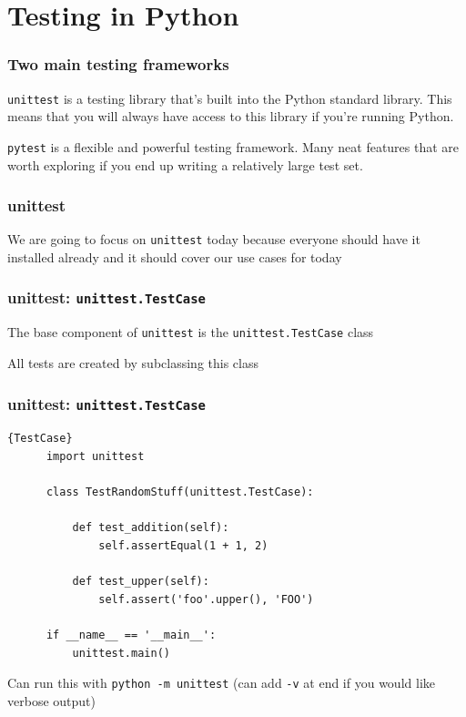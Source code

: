 \documentclass[10pt]{beamer}
\begin{document}
\section{Testing in Python}

  \begin{frame} \frametitle{Two main testing frameworks}

    \texttt{unittest} is a testing library that's built into the Python standard library.
    This means that you will always have access to this library if you're running Python.

    \vspace{0.25cm}

    \texttt{pytest} is a flexible and powerful testing framework. Many neat features
    that are worth exploring if you end up writing a relatively large test set.

  \end{frame}

  \begin{frame} \frametitle{unittest}

    We are going to focus on \texttt{unittest} today because everyone should have it
    installed already and it should cover our use cases for today

  \end{frame}

  \begin{frame} \frametitle{unittest: \texttt{unittest.TestCase}}

    The base component of \texttt{unittest} is the \texttt{unittest.TestCase} class

    \vspace{0.25cm}

    All tests are created by subclassing this class

  \end{frame}

  \begin{frame}[fragile] \frametitle{unittest: \texttt{unittest.TestCase}}

      \begin{lstlisting}{TestCase}
      import unittest

      class TestRandomStuff(unittest.TestCase):

          def test_addition(self):
              self.assertEqual(1 + 1, 2)

          def test_upper(self):
              self.assert('foo'.upper(), 'FOO')

      if __name__ == '__main__':
          unittest.main()

      \end{lstlisting}

      Can run this with \texttt{python -m unittest} (can add \texttt{-v} at end if
      you would like verbose output)

  \end{frame}
\end{document}
